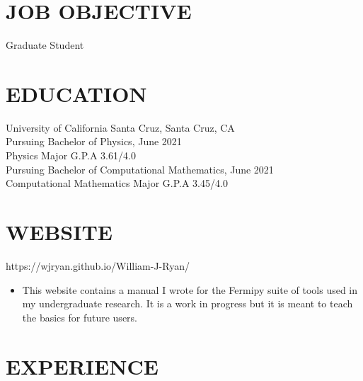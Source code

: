 \documentclass{res}
\begin{document}
 


\address{\bf  PRESENT ADDRESS\\522 14th ave.\\Santa Cruz, CA 95062\\(831) 428-6558}
                                  
\begin{resume}

\section{JOB OBJECTIVE}          
    Graduate Student 
 
\section{EDUCATION}          
    University of California Santa Cruz, Santa Cruz, CA  \\        
    Pursuing Bachelor of Physics, June 2021    \\ 
    Physics Major G.P.A 3.61/4.0	\\
    Pursuing Bachelor of Computational Mathematics, June 2021	  \\              
    Computational Mathematics Major G.P.A 3.45/4.0	\\        

\section{WEBSITE}
	https://wjryan.github.io/William-J-Ryan/
	\begin{itemize}
	\item This website contains a manual I wrote for the Fermipy suite of tools used in my undergraduate research. It is a work in progress but it is meant to teach the basics for future users.
	\end{itemize}
 
\section{EXPERIENCE}
   \vspace{-0.1in}	


\end{resume}
\end{document}
